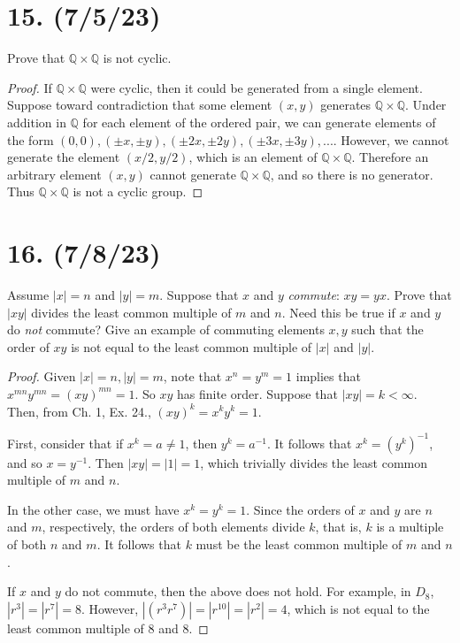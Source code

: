 \documentclass{article}
\begin{document}
\section*{15. (7/5/23)}

Prove that $\mathbb{Q} \times \mathbb{Q}$ is not cyclic.

\begin{proof}
    If $\mathbb{Q} \times \mathbb{Q}$ were cyclic, then it could be generated from a single element. Suppose toward contradiction that some element $(x, y)$ generates $\mathbb{Q} \times \mathbb{Q}$. Under addition in $\mathbb{Q}$ for each element of the ordered pair, we can generate elements of the form $(0, 0), (\pm x, \pm y), (\pm 2x, \pm 2y), (\pm 3x, \pm 3y), ...$. However, we cannot generate the element $(x/2, y/2)$, which is an element of $\mathbb{Q} \times \mathbb{Q}$. Therefore an arbitrary element $(x, y)$ cannot generate $\mathbb{Q} \times \mathbb{Q}$, and so there is no generator. Thus $\mathbb{Q} \times \mathbb{Q}$ is not a cyclic group.
\end{proof}

\section*{16. (7/8/23)}

Assume $|x| = n$ and $|y| = m$. Suppose that $x$ and $y$ \emph{commute}: $xy = yx$. Prove that $|xy|$ divides the least common multiple of $m$ and $n$. Need this be true if $x$ and $y$ do \emph{not} commute? Give an example of commuting elements $x, y$ such that the order of $xy$ is not equal to the least common multiple of $|x|$ and $|y|$.

\begin{proof}
    Given $|x| = n, |y| = m$, note that $x^n = y^m = 1$ implies that $x^{mn} y^{mn} = (xy)^{mn} = 1$. So $xy$ has finite order. Suppose that $|xy| = k < \infty$. Then, from Ch. 1, Ex. 24., $(xy)^k = x^k y^k = 1$.
    
    First, consider that if $x^k = a \neq 1$, then $y^k = a^{-1}$. It follows that $x^k = (y^k)^{-1}$, and so $x = y^{-1}$. Then $|xy| = |1| = 1$, which trivially divides the least common multiple of $m$ and $n$.

    In the other case, we must have $x^k = y^k = 1$. Since the orders of $x$ and $y$ are $n$ and $m$, respectively, the orders of both elements divide $k$, that is, $k$ is a multiple of both $n$ and $m$. It follows that $k$ must be the least common multiple of $m$ and $n$.

    If $x$ and $y$ do not commute, then the above does not hold. For example, in $D_8$, $|r^3| = |r^7| = 8$. However, $|(r^3 r^7)| = |r^{10}| = |r^2| = 4$, which is not equal to the least common multiple of 8 and 8.
\end{proof}
\end{document}
